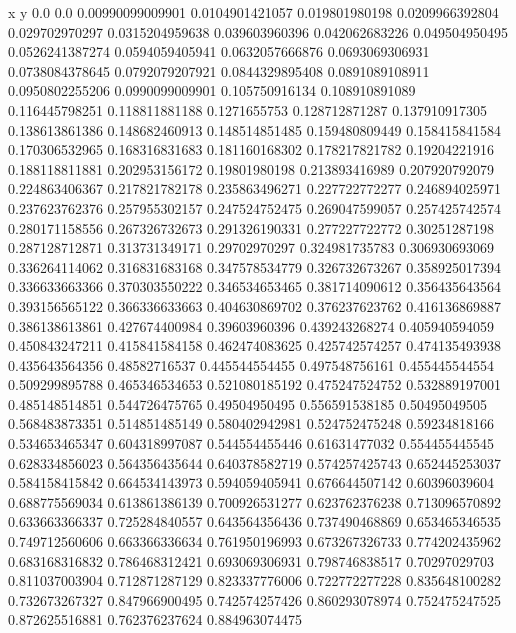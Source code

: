               x                y
            0.0              0.0
0.00990099009901  0.0104901421057
 0.019801980198  0.0209966392804
 0.029702970297  0.0315204959638
 0.039603960396   0.042062683226
 0.049504950495  0.0526241387274
0.0594059405941  0.0632057666876
0.0693069306931  0.0738084378645
0.0792079207921  0.0844329895408
0.0891089108911  0.0950802255206
0.0990099009901   0.105750916134
 0.108910891089   0.116445798251
 0.118811881188     0.1271655753
 0.128712871287   0.137910917305
 0.138613861386   0.148682460913
 0.148514851485   0.159480809449
 0.158415841584   0.170306532965
 0.168316831683   0.181160168302
 0.178217821782    0.19204221916
 0.188118811881   0.202953156172
  0.19801980198   0.213893416989
 0.207920792079   0.224863406367
 0.217821782178   0.235863496271
 0.227722772277   0.246894025971
 0.237623762376   0.257955302157
 0.247524752475   0.269047599057
 0.257425742574   0.280171158556
 0.267326732673   0.291326190331
 0.277227722772    0.30251287198
 0.287128712871   0.313731349171
  0.29702970297   0.324981735783
 0.306930693069   0.336264114062
 0.316831683168   0.347578534779
 0.326732673267   0.358925017394
 0.336633663366   0.370303550222
 0.346534653465   0.381714090612
 0.356435643564   0.393156565122
 0.366336633663   0.404630869702
 0.376237623762   0.416136869887
 0.386138613861   0.427674400984
  0.39603960396   0.439243268274
 0.405940594059   0.450843247211
 0.415841584158   0.462474083625
 0.425742574257   0.474135493938
 0.435643564356    0.48582716537
 0.445544554455   0.497548756161
 0.455445544554   0.509299895788
 0.465346534653   0.521080185192
 0.475247524752   0.532889197001
 0.485148514851   0.544726475765
  0.49504950495   0.556591538185
  0.50495049505   0.568483873351
 0.514851485149   0.580402942981
 0.524752475248    0.59234818166
 0.534653465347   0.604318997087
 0.544554455446    0.61631477032
 0.554455445545   0.628334856023
 0.564356435644   0.640378582719
 0.574257425743   0.652445253037
 0.584158415842   0.664534143973
 0.594059405941   0.676644507142
  0.60396039604   0.688775569034
 0.613861386139   0.700926531277
 0.623762376238   0.713096570892
 0.633663366337   0.725284840557
 0.643564356436   0.737490468869
 0.653465346535   0.749712560606
 0.663366336634   0.761950196993
 0.673267326733   0.774202435962
 0.683168316832   0.786468312421
 0.693069306931   0.798746838517
  0.70297029703   0.811037003904
 0.712871287129   0.823337776006
 0.722772277228   0.835648100282
 0.732673267327   0.847966900495
 0.742574257426   0.860293078974
 0.752475247525   0.872625516881
 0.762376237624   0.884963074475
